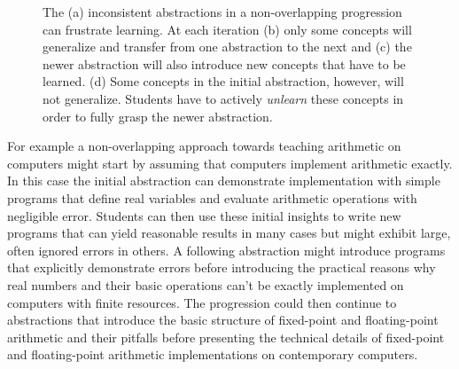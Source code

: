 \documentclass[
  letterpaper,
  DIV=11,
  numbers=noendperiod]{scrartcl}
\begin{document}
\begin{figure}
\begin{minipage}[t]{0.33\linewidth}
{{}

}

\subcaption{\label{fig-unlearning3}}
\end{minipage}%
%
\begin{minipage}[t]{0.33\linewidth}

{\centering 


}

\subcaption{\label{fig-unlearning4}}
\end{minipage}%

\caption{\label{fig-unlearning}The (a) inconsistent abstractions in a
non-overlapping progression can frustrate learning. At each iteration
(b) only some concepts will generalize and transfer from one abstraction
to the next and (c) the newer abstraction will also introduce new
concepts that have to be learned. (d) Some concepts in the initial
abstraction, however, will not generalize. Students have to actively
\emph{unlearn} these concepts in order to fully grasp the newer
abstraction.}

\end{figure}

For example a non-overlapping approach towards teaching arithmetic on
computers might start by assuming that computers implement arithmetic
exactly. In this case the initial abstraction can demonstrate
implementation with simple programs that define real variables and
evaluate arithmetic operations with negligible error. Students can then
use these initial insights to write new programs that can yield
reasonable results in many cases but might exhibit large, often ignored
errors in others. A following abstraction might introduce programs that
explicitly demonstrate errors before introducing the practical reasons
why real numbers and their basic operations can't be exactly implemented
on computers with finite resources. The progression could then continue
to abstractions that introduce the basic structure of fixed-point and
floating-point arithmetic and their pitfalls before presenting the
technical details of fixed-point and floating-point arithmetic
implementations on contemporary computers.
\end{document}
